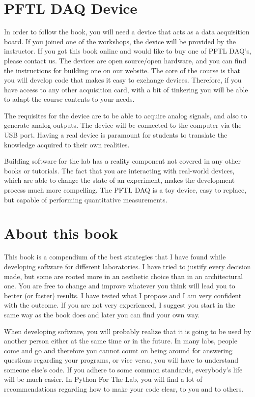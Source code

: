 \section{PFTL DAQ Device}
In order to follow the book, you will need a device that acts as a data acquisition board. If you joined one of the workshops, the device will be provided by the instructor. If you got this book online and would like to buy one of PFTL DAQ's, please contact us. The devices are open source/open hardware, and you can find the instructions for building one on our website. The core of the course is that you will develop code that makes it easy to exchange devices. Therefore, if you have access to any other acquisition card, with a bit of tinkering you will be able to adapt the course contents to your needs. 

The requisites for the device are to be able to acquire analog signals, and also to generate analog outputs. The device will be connected to the computer via the USB port. Having a real device is paramount for students to translate the knowledge acquired to their own realities. 

Building software for the lab has a reality component not covered in any other books or tutorials. The fact that you are interacting with real-world devices, which are able to change the state of an experiment, makes the development process much more compelling. The PFTL DAQ is a toy device, easy to replace, but capable of performing quantitative measurements. 

\section{About this book}
This book is a compendium of the best strategies that I have found while developing software for different laboratories. I have tried to justify every decision made, but some are rooted more in an aesthetic choice than in an architectural one. You are free to change and improve whatever you think will lead you to better (or faster) results. I have tested what I propose and I am very confident with the outcome. If you are not very experienced, I suggest you start in the same way as the book does and later you can find your own way.

When developing software, you will probably realize that it is going to be used by another person either at the same time or in the future. In many labs, people come and go and therefore you cannot count on being around for answering questions regarding your programs, or vice versa, you will have to understand someone else’s code. If you adhere to some common standards, everybody’s life will be much easier. In Python For The Lab, you will find a lot of recommendations regarding how to make your code clear, to you and to others.

